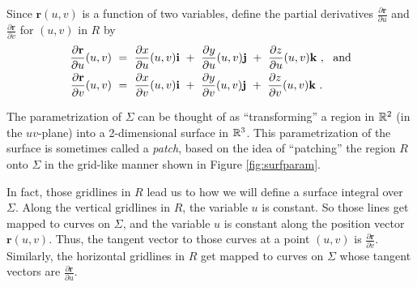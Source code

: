 Since $\textbf{r}(u,v)$ is a function of two variables, define the partial derivatives
$\frac{\partial \textbf{r}}{\partial u}$ and $\frac{\partial \textbf{r}}{\partial v}$ for $(u,v)$ in $R$ by
\begin{align*}
 \frac{\partial \textbf{r}}{\partial u}(u,v) ~&=~
 \frac{\partial x}{\partial u}(u,v) \textbf{i} ~+~ \frac{\partial y}{\partial u}(u,v) \textbf{j} ~+~
 \frac{\partial z}{\partial u}(u,v) \textbf{k} ~,~~\text{and}\vspace{1mm}\\
 \frac{\partial \textbf{r}}{\partial v}(u,v) ~&=~
 \frac{\partial x}{\partial v}(u,v) \textbf{i} ~+~ \frac{\partial y}{\partial v}(u,v) \textbf{j} ~+~
 \frac{\partial z}{\partial v}(u,v) \textbf{k} ~.
\end{align*}

The parametrization of $\Sigma$ can be thought of as ``transforming'' a region in $\mathbb{R}^{2}$ (in the $uv$-plane) into
a 2-dimensional surface in $\mathbb{R}^{3}$. This parametrization of the surface is sometimes called a \emph{patch}, based
on the idea of ``patching'' the region $R$ onto $\Sigma$ in the grid-like manner shown in Figure \ref{fig:surfparam}.

In fact, those gridlines in $R$ lead us to how we will define a surface integral over $\Sigma$. Along the
vertical gridlines in $R$, the variable $u$ is constant. So those lines get mapped to curves on $\Sigma$, and the
variable $u$ is constant along the position vector $\textbf{r}(u,v)$. Thus, the tangent vector to those curves at a
point $(u,v)$ is $\frac{\partial \textbf{r}}{\partial v}$. Similarly, the horizontal gridlines in $R$ get mapped to
curves on $\Sigma$ whose tangent vectors are $\frac{\partial \textbf{r}}{\partial u}$.

